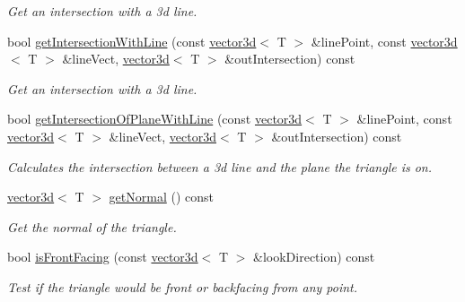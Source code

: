 \begin{DoxyCompactItemize}
\begin{DoxyCompactList}\small\item\em Get an intersection with a 3d line. \end{DoxyCompactList}\item 
bool \hyperlink{classirr_1_1core_1_1triangle3d_a70e0d27d17f9f0d14117df912cdaafe1}{get\+Intersection\+With\+Line} (const \hyperlink{classirr_1_1core_1_1vector3d}{vector3d}$<$ T $>$ \&line\+Point, const \hyperlink{classirr_1_1core_1_1vector3d}{vector3d}$<$ T $>$ \&line\+Vect, \hyperlink{classirr_1_1core_1_1vector3d}{vector3d}$<$ T $>$ \&out\+Intersection) const
\begin{DoxyCompactList}\small\item\em Get an intersection with a 3d line. \end{DoxyCompactList}\item 
bool \hyperlink{classirr_1_1core_1_1triangle3d_a860339e3646bf2f7cbb7e88be1cf0783}{get\+Intersection\+Of\+Plane\+With\+Line} (const \hyperlink{classirr_1_1core_1_1vector3d}{vector3d}$<$ T $>$ \&line\+Point, const \hyperlink{classirr_1_1core_1_1vector3d}{vector3d}$<$ T $>$ \&line\+Vect, \hyperlink{classirr_1_1core_1_1vector3d}{vector3d}$<$ T $>$ \&out\+Intersection) const
\begin{DoxyCompactList}\small\item\em Calculates the intersection between a 3d line and the plane the triangle is on. \end{DoxyCompactList}\item 
\hyperlink{classirr_1_1core_1_1vector3d}{vector3d}$<$ T $>$ \hyperlink{classirr_1_1core_1_1triangle3d_af894905e54d2c29bdb23f95f892604f1}{get\+Normal} () const
\begin{DoxyCompactList}\small\item\em Get the normal of the triangle. \end{DoxyCompactList}\item 
bool \hyperlink{classirr_1_1core_1_1triangle3d_a9befd6b07fc8067d16cf313b35b835db}{is\+Front\+Facing} (const \hyperlink{classirr_1_1core_1_1vector3d}{vector3d}$<$ T $>$ \&look\+Direction) const
\begin{DoxyCompactList}\small\item\em Test if the triangle would be front or backfacing from any point. \end{DoxyCompactList}\item 
\mbox{\label{classirr_1_1core_1_1triangle3d_a7b5460728cb47e5b2abb6d0e64b74577}} 

\end{DoxyCompactItemize}
